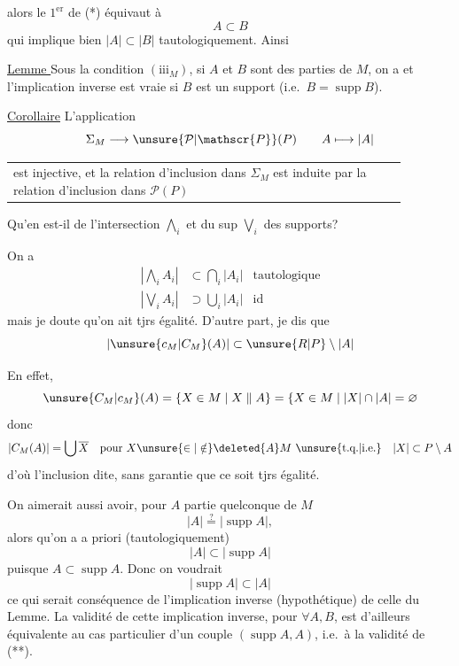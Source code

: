 alors le $1^{\mathrm{er}}$  de (*)  équivaut à
\[
A\subset B
\]
qui implique bien $|A|\subset|B|$ tautologiquement. Ainsi

\uline{Lemme } Sous la  condition $(\mathrm{iii}_M)$, si $A$ et $B$ sont des parties de $M$, on a
et l'implication inverse est vraie si $B$ est un support (i.e.\ $B=\operatorname{supp}B$).

\uline{Corollaire} L'application
\[
\Sigma_M\longrightarrow\unsure{\mathcal{P}|\mathscr{P}}(P)\qquad A\longmapsto|A|
\]
\begin{tabular}{|p{0.88\linewidth}}
est injective, et la relation d'inclusion dans $\Sigma_M$ est induite par la relation d'inclusion dans $\mathcal{P}(P)$
\end{tabular}

Qu'en est-il de l'intersection $\bigwedge_i$  et du  sup $\bigvee_i$ des supports?

On a
\[
\begin{aligned}
\left|\bigwedge_i A_i\right|&\subset\bigcap_i|A_i|&\text{tautologique}\\
\left|\bigvee_i A_i\right|&\supset\bigcup_i|A_i|&\text{id}
\end{aligned}
\]
mais je doute qu'on ait tjrs égalité. D'autre part, je dis que
\[
|\unsure{c_M|C_M}(A)|\subset\unsure{R|P}\setminus|A|
\]

En effet,
\[
\unsure{C_M|c_M}(A)=\{X\in M\mid X\parallel A\}
=\{X\in M\mid |X|\cap|A|=\varnothing
\]
donc
\[
|C_M(A)|=\bigcup\overline X\quad\text{pour }X\unsure{\in|\notin}\deleted{A}M\ \unsure{\text{t.q.}|\text{i.e.}}\quad |X|\subset P\setminus A
\]
d'où l'inclusion dite, sans garantie que ce soit tjrs égalité.

On aimerait aussi avoir, pour $A$ partie quelconque de $M$
\[
|A|\overset{?}{=}|\operatorname{supp}A|,
\tag*{(**)}
\]
alors qu'on a a priori (tautologiquement)
\[
|A|\subset|\operatorname{supp}A|
\]
puisque $A\subset\operatorname{supp}A$.  Donc on voudrait
\[
|\operatorname{supp}A|\subset|A|
\]
ce qui serait conséquence de l'implication inverse (hypothétique) de celle du Lemme. La validité de cette implication inverse, pour $\forall A,B$, est d'ailleurs équivalente au cas particulier d'un couple $(\operatorname{supp}A,A)$, i.e.\ à la validité de (**).

